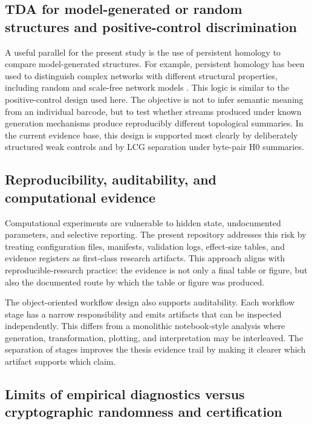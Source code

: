 \subsection{TDA for model-generated or random structures and positive-control discrimination}
\label{subsec:related-positive-controls}

A useful parallel for the present study is the use of persistent homology to compare model-generated structures. For example, persistent homology has been used to distinguish complex networks with different structural properties, including random and scale-free network models \citep{horak2009persistent}. This logic is similar to the positive-control design used here. The objective is not to infer semantic meaning from an individual barcode, but to test whether streams produced under known generation mechanisms produce reproducibly different topological summaries. In the current evidence base, this design is supported most clearly by deliberately structured weak controls and by LCG separation under byte-pair H0 summaries.

\subsection{Reproducibility, auditability, and computational evidence}
\label{subsec:related-reproducibility}

Computational experiments are vulnerable to hidden state, undocumented parameters, and selective reporting. The present repository addresses this risk by treating configuration files, manifests, validation logs, effect-size tables, and evidence registers as first-class research artifacts. This approach aligns with reproducible-research practice: the evidence is not only a final table or figure, but also the documented route by which the table or figure was produced.

The object-oriented workflow design also supports auditability. Each workflow stage has a narrow responsibility and emits artifacts that can be inspected independently. This differs from a monolithic notebook-style analysis where generation, transformation, plotting, and interpretation may be interleaved. The separation of stages improves the thesis evidence trail by making it clearer which artifact supports which claim.

\subsection{Limits of empirical diagnostics versus cryptographic randomness and certification}
\label{subsec:related-limits}

